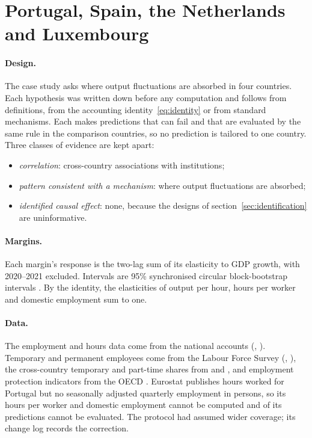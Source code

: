 \section{Portugal, Spain, the Netherlands and Luxembourg}\label{sec:cases}

\paragraph{Design.} The case study asks where output fluctuations are absorbed in four
countries. Each hypothesis was written down before any computation and follows from
definitions, from the accounting identity~\eqref{eq:identity} or from standard mechanisms.
Each makes predictions that can fail and that are evaluated by the same rule in the
comparison countries, so no prediction is tailored to one country. Three classes of
evidence are kept apart:
\begin{itemize}
  \item \emph{correlation}: cross-country associations with institutions;
  \item \emph{pattern consistent with a mechanism}: where output fluctuations are absorbed;
  \item \emph{identified causal effect}: none, because the designs of
    section~\ref{sec:identification} are uninformative.
\end{itemize}

\paragraph{Margins.} Each margin's response is the two-lag sum of its elasticity to GDP
growth, with 2020--2021 excluded. Intervals are 95\% synchronised circular block-bootstrap
intervals \citep{kunsch1989bootstrap}. By the identity, the elasticities of output per hour,
hours per worker and domestic employment sum to one.

\paragraph{Data.} The employment and hours data come from the national accounts
(, ). Temporary and permanent employees
come from the Labour Force Survey (, ), the
cross-country temporary and part-time shares from
 and , and employment protection indicators from
the OECD \citep{oecd2020epl}. Eurostat publishes hours worked for Portugal but no
seasonally adjusted quarterly employment in persons, so its hours per worker and domestic
employment cannot be computed and  of its predictions cannot be
evaluated. The protocol
had assumed wider coverage; its change log records the correction.

